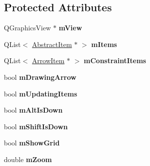 \subsection*{Protected Attributes}
\begin{DoxyCompactItemize}
\item 
\hypertarget{class_abstract_scene_a3dca510392e1f6e70afcdd66aa253b88}{Q\-Graphics\-View $\ast$ {\bfseries m\-View}}\label{class_abstract_scene_a3dca510392e1f6e70afcdd66aa253b88}

\item 
\hypertarget{class_abstract_scene_a5d49c7e5b524fffe3726759968ac84ef}{Q\-List$<$ \hyperlink{class_abstract_item}{Abstract\-Item} $\ast$ $>$ {\bfseries m\-Items}}\label{class_abstract_scene_a5d49c7e5b524fffe3726759968ac84ef}

\item 
\hypertarget{class_abstract_scene_a1fd1a2e578b99daada1340af497c7c2e}{Q\-List$<$ \hyperlink{class_arrow_item}{Arrow\-Item} $\ast$ $>$ {\bfseries m\-Constraint\-Items}}\label{class_abstract_scene_a1fd1a2e578b99daada1340af497c7c2e}

\item 
\hypertarget{class_abstract_scene_a98448e72e77a4aab8e03c3fe18ad6912}{bool {\bfseries m\-Drawing\-Arrow}}\label{class_abstract_scene_a98448e72e77a4aab8e03c3fe18ad6912}

\item 
\hypertarget{class_abstract_scene_a336fa2b401a9725db7d42c00bf199caf}{bool {\bfseries m\-Updating\-Items}}\label{class_abstract_scene_a336fa2b401a9725db7d42c00bf199caf}

\item 
\hypertarget{class_abstract_scene_a60fe382d87a3fc7937908e46566e199e}{bool {\bfseries m\-Alt\-Is\-Down}}\label{class_abstract_scene_a60fe382d87a3fc7937908e46566e199e}

\item 
\hypertarget{class_abstract_scene_aed9a26fb5ac45202baaebebe63559877}{bool {\bfseries m\-Shift\-Is\-Down}}\label{class_abstract_scene_aed9a26fb5ac45202baaebebe63559877}

\item 
\hypertarget{class_abstract_scene_a4912c42b311b883c22ab30c615885feb}{bool {\bfseries m\-Show\-Grid}}\label{class_abstract_scene_a4912c42b311b883c22ab30c615885feb}

\item 
\hypertarget{class_abstract_scene_aebead75829efd435c0f3abe73fd0ce44}{double {\bfseries m\-Zoom}}\label{class_abstract_scene_aebead75829efd435c0f3abe73fd0ce44}

\end{DoxyCompactItemize}


